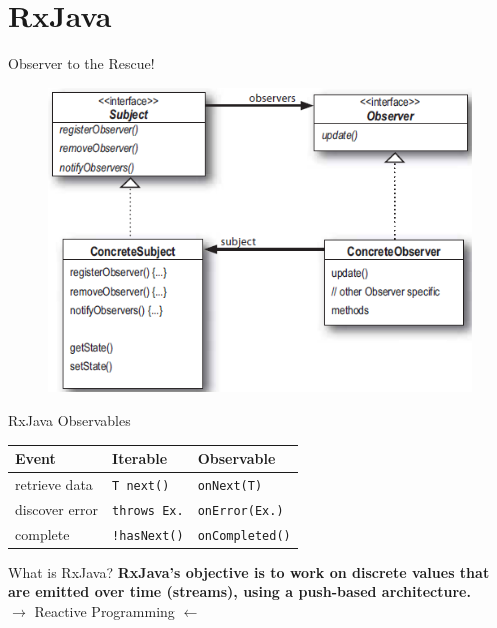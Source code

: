 \section{RxJava}
\begin{frame}{Observer to the Rescue!}
	\begin{figure}[h]
		\includegraphics[width=1.0\textwidth,page=1]{gfx/observer_pattern}
	\end{figure}
\end{frame}

\begin{frame}{RxJava Observables}
    \centering
    \begin{tabular}{*3l}
        \toprule
        \textbf{Event} & \textbf{Iterable} & \textbf{Observable} \\
        \midrule
        retrieve data & \texttt{T next()} & \texttt{onNext(T)} \\
        discover error & \texttt{throws Ex.} & \cellcolor{green!50} \texttt{onError(Ex.)} \\
        complete & \texttt{!hasNext()} & \cellcolor{green!50} \texttt{onCompleted()} \\
        \bottomrule
    \end{tabular}
\end{frame}

\begin{frame}{What is RxJava?}
    \centering
    \Large
    \textbf{RxJava's objective is to work on discrete values that are emitted over time (streams), using a push-based architecture.}\\
    \bigskip
    $\rightarrow$ Reactive Programming $\leftarrow$
\end{frame}

